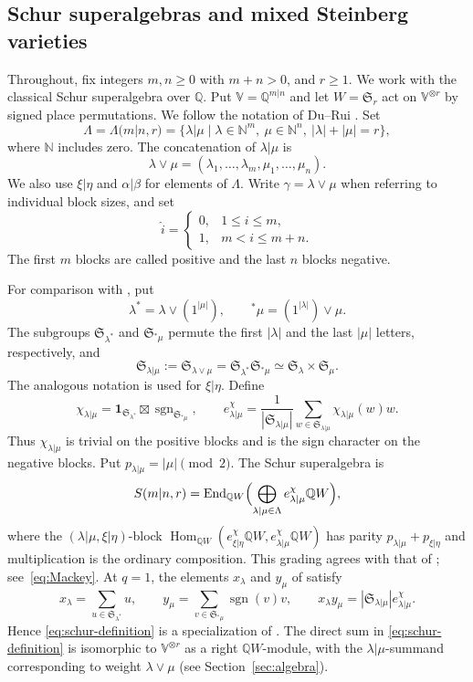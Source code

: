\documentclass[11pt,a4paper]{amsart}
\theoremstyle{definition}
\theoremstyle{remark}
\newcommand{\Q}{\mathbb Q}
\newcommand{\End}{\operatorname{End}}
\newcommand{\Hom}{\operatorname{Hom}}
\newcommand{\sgn}{\operatorname{sgn}}
\newcommand{\lm}{\lambda|\mu}
\newcommand{\xh}{\xi|\eta}
\newcommand{\ab}{\alpha|\beta}
\numberwithin{equation}{section}
\begin{document}
\subsection{Schur superalgebras and mixed Steinberg varieties}
Throughout, fix integers $m,n\geq0$ with $m+n>0$, and $r\geq1$.
We work with the classical Schur superalgebra over $\Q$. Put
$\mathbb V=\Q^{m|n}$ and let $W=\mathfrak S_r$ act on
$\mathbb V^{\otimes r}$ by signed place permutations. We follow the
notation of Du--Rui \cite[Sections~1 and~3]{DuRui}. Set
$$
\Lambda=\Lambda(m|n,r)
=\{\lm\mid\lambda\in\mathbb N^m,\ \mu\in\mathbb N^n,
\ |\lambda|+|\mu|=r\},
$$
where $\mathbb N$ includes zero. The concatenation of $\lm$ is
$$
\lambda\vee\mu=(\lambda_1,\ldots,\lambda_m,\mu_1,\ldots,\mu_n).
$$
We also use $\xh$ and $\ab$ for elements of $\Lambda$. Write
$\gamma=\lambda\vee\mu$ when referring to individual block sizes,
and set
$$
\widehat i=
\begin{cases}0,&1\leq i\leq m,\\1,&m<i\leq m+n.\end{cases}
$$
The first $m$ blocks are called positive and the last $n$ blocks
negative.

For comparison with \cite[Section~3]{DuRui}, put
$$
\lambda^*=\lambda\vee(1^{|\mu|}),\qquad
{}^*\mu=(1^{|\lambda|})\vee\mu.
$$
The subgroups $\mathfrak S_{\lambda^*}$ and
$\mathfrak S_{{}^*\mu}$ permute the first $|\lambda|$ and the last
$|\mu|$ letters, respectively, and
$$
\mathfrak S_{\lm}:=\mathfrak S_{\lambda\vee\mu}
=\mathfrak S_{\lambda^*}\mathfrak S_{{}^*\mu}
\simeq\mathfrak S_\lambda\times\mathfrak S_\mu.
$$
The analogous notation is used for $\xh$. Define
\begin{equation}\label{eq:characters}
\chi_{\lm}=\mathbf1_{\mathfrak S_{\lambda^*}}
\boxtimes\sgn_{\mathfrak S_{{}^*\mu}},\qquad
e_{\lm}^\chi=\frac{1}{|\mathfrak S_{\lm}|}
\sum_{w\in\mathfrak S_{\lm}}\chi_{\lm}(w)w.
\end{equation}
Thus $\chi_{\lm}$ is trivial on the positive blocks and is the sign
character on the negative blocks. Put $p_{\lm}=|\mu|\pmod2$. The Schur superalgebra is
\begin{equation}\label{eq:schur-definition}
S(m|n,r)
=\End_{\Q W}\Bigl(\bigoplus_{\lm\in\Lambda}e_{\lm}^\chi\Q W\Bigr),
\end{equation}
where the $(\lm,\xh)$-block
$\Hom_{\Q W}(e_{\xh}^\chi\Q W,e_{\lm}^\chi\Q W)$ has parity
$p_{\lm}+p_{\xh}$ and multiplication is the ordinary composition. This
grading agrees with that of \cite[(5.6.1)]{DuRui}; see~\eqref{eq:Mackey}. At $q=1$, the elements
$x_\lambda$ and $y_\mu$ of \cite[Section~5]{DuRui} satisfy
$$
x_\lambda=\sum_{u\in\mathfrak S_{\lambda^*}}u,\qquad
y_\mu=\sum_{v\in\mathfrak S_{{}^*\mu}}\sgn(v)v,\qquad
x_\lambda y_\mu=|\mathfrak S_{\lm}|e_{\lm}^\chi.
$$
Hence \eqref{eq:schur-definition} is a specialization of
\cite[Definition~5.6]{DuRui}. The direct sum in
\eqref{eq:schur-definition} is isomorphic to $\mathbb V^{\otimes r}$
as a right $\Q W$-module, with the $\lm$-summand corresponding to
weight $\lambda\vee\mu$ (see Section~\ref{sec:algebra}).
\end{document}
